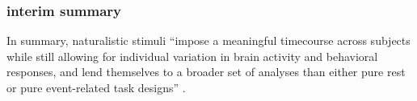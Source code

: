 \begin{comment}
%
``Naturalistic stimuli such as movies and stories are often used to generate
such training data, though any study design in which participants perform the
same sequence of trials --- or for which a common sequence can be spliced
together from the same set of trials --- could be used (for example, a battery
of cognitive tasks)'' \citep{cohen2017computational}

``Estimating the parameters to transform high-dimensional spaces from individual
brains into a common high-dimensional space requires a rich set of data that
samples a wide variety of cortical patterns in order to generalize to novel
stimuli or tasks. For response hyperalignment, a rich variety of stimuli or
conditions are necessary to sample the response vector space. For connectivity
hyperalignment, the sampling of connectivity vector space is defined by the
selection of connectivity targets, but the richness and reliability of
connectivity estimates depends on the variety of brain states over which
connectivity is estimated'' \citep{haxby2020hyperalignment}.


\paragraph{compliance}
%
``As a rule of thumb, SRM will improve sensitivity for detecting a cognitive
process of interest in the test data if the training stimuli or trials strongly
and variably engage that process in a way that is reliable across participants''
\citep{cohen2017computational}.

%
``Movies are more engaging and result in better compliance
\citep{vanderwal2015inscapes}. Movie viewing can also be used in subject
populations, such as children \citep{richardson2018development} or patients,
that may have trouble maintaining attention during repetitions of a tedious
localizer task'' \citep{jiahui2020predicting}.


\end{comment}




\subsubsection{interim summary}
In summary, naturalistic stimuli ``impose a meaningful timecourse across
subjects while still allowing for individual variation in brain activity and
behavioral responses, and lend themselves to a broader set of analyses than
either pure rest or pure event-related task designs'' \citep{finn2017can}.

